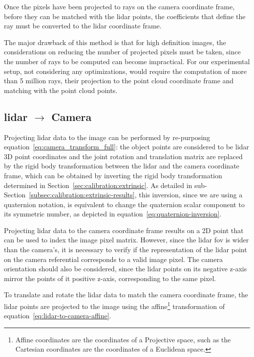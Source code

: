 Once the pixels have been projected to rays on the camera coordinate frame, before they can be matched with the \ac{lidar} points, the coefficients that define the ray must be converted to the \ac{lidar} coordinate frame.

The major drawback of this method is that for high definition images, the considerations on reducing the number of projected pixels must be taken, since the number of rays to be computed can become impractical. For our experimental setup, not considering any optimizations, would require the computation of more than 5 million rays, their projection to the point cloud coordinate frame and matching with the point cloud points.


\subsection{\ac{lidar} $\rightarrow$ Camera}
\label{subsec:sensor-fusion-lidar-to-camera}
Projecting \ac{lidar} data to the image can be performed by re-purposing equation~\eqref{eq:camera_transform_full}: the object points are considered to be \ac{lidar} 3D point coordinates and the joint rotation and translation matrix are replaced by the rigid body transformation between the \ac{lidar} and the camera coordinate frame, which can be obtained by inverting the rigid body transformation determined in Section~\ref{sec:calibration:extrinsic}. As detailed in sub-Section~\ref{subsec:calibration:extrinsic-results}, this inversion, since we are using a quaternion notation, is equivalent to change the quaternion scalar component to its symmetric number, as depicted in equation~\eqref{eq:quaternion-inversion}.

Projecting \ac{lidar} data to the camera coordinate frame results on a 2D point that can be used to index the image pixel matrix. However, since the \ac{lidar} \ac{fov} is wider than the camera's, it is necessary to verify if the representation of the \ac{lidar} point on the camera referential corresponds to a valid image pixel. The camera orientation should also be considered, since the \ac{lidar} points on its negative z-axis mirror the points of it positive z-axis, corresponding to the same pixel.

To translate and rotate the \ac{lidar} data to match the camera coordinate frame, the \ac{lidar} points are projected to the image using the affine\footnote{Affine coordinates are the coordinates of a Projective space, such as the Cartesian coordinates are the coordinates of a Euclidean space.} transformation of equation~\ref{eq:lidar-to-camera-affine}. 

